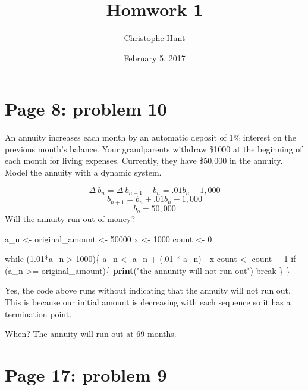\documentclass[]{article}
\title{Homwork 1}
\author{Christophe Hunt}
\date{February 5, 2017}
\newenvironment{Shaded}{\begin{snugshade}}{\end{snugshade}}
\newcommand{\KeywordTok}[1]{\textcolor[rgb]{0.13,0.29,0.53}{\textbf{{#1}}}}
\newcommand{\DecValTok}[1]{\textcolor[rgb]{0.00,0.00,0.81}{{#1}}}
\newcommand{\FloatTok}[1]{\textcolor[rgb]{0.00,0.00,0.81}{{#1}}}
\newcommand{\StringTok}[1]{\textcolor[rgb]{0.31,0.60,0.02}{{#1}}}
\newcommand{\NormalTok}[1]{{#1}}
\begin{document}
\maketitle

{
\setcounter{tocdepth}{2}
\tableofcontents
}
\section{Page 8: problem 10}\label{page-8-problem-10}

An annuity increases each month by an automatic deposit of 1\% interest
on the previous month's balance. Your grandparents withdraw \$1000 at
the beginning of each month for living expenses. Currently, they have
\$50,000 in the annuity. Model the annuity with a dynamic system.

\[\Delta~b_n=\Delta~b_{n+1}-b_n= .01b_n - 1,000\]
\[b_{n+1}=b_n+ .01b_n - 1,000\] \[b_o = 50,000\] Will the annuity run
out of money?

\begin{Shaded}
\begin{Highlighting}[]
\NormalTok{a_n   <-}\StringTok{ }\NormalTok{original_amount <-}\StringTok{ }\DecValTok{50000}
\NormalTok{x     <-}\StringTok{ }\DecValTok{1000}
\NormalTok{count <-}\StringTok{ }\DecValTok{0}

\NormalTok{while (}\FloatTok{1.01}\NormalTok{*a_n >}\StringTok{ }\DecValTok{1000}\NormalTok{)\{}
\NormalTok{a_n <-}\StringTok{ }\NormalTok{a_n +}\StringTok{ }\NormalTok{(.}\DecValTok{01} \NormalTok{*}\StringTok{ }\NormalTok{a_n) -}\StringTok{ }\NormalTok{x}
\NormalTok{count <-}\StringTok{ }\NormalTok{count +}\StringTok{ }\DecValTok{1}
\NormalTok{if (a_n >=}\StringTok{ }\NormalTok{original_amount)\{}
  \KeywordTok{print}\NormalTok{(}\StringTok{"the annunity will not run out"}\NormalTok{)}
  \NormalTok{break}
 \NormalTok{\}}
\NormalTok{\}}
\end{Highlighting}
\end{Shaded}

Yes, the code above runs without indicating that the annuity will not
run out. This is because our initial amount is decreasing with each
sequence so it has a termination point.

When? The annuity will run out at 69 months.

\newpage

\section{Page 17: problem 9}\label{page-17-problem-9}
\end{document}
